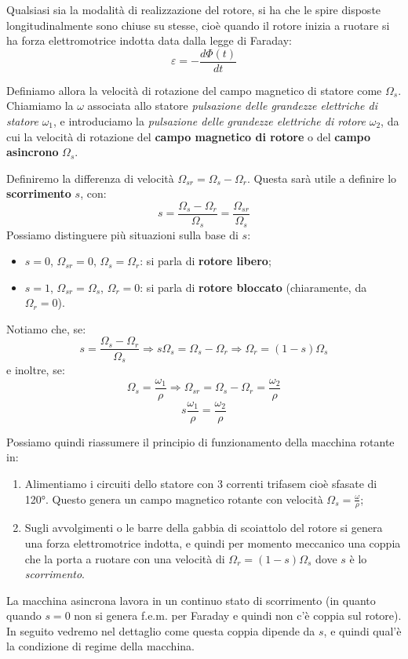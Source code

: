 \documentclass[a4paper,11pt]{article}
\begin{document}
\begin{itemize}
Qualsiasi sia la modalità di realizzazione del rotore, si ha che le spire disposte longitudinalmente sono chiuse su stesse, cioè quando il rotore inizia a ruotare si ha forza elettromotrice indotta data dalla legge di Faraday:
$$
\varepsilon = -\frac{d \Phi(t)}{dt}
$$

Definiamo allora la velocità di rotazione del campo magnetico di statore come $\Omega_s$. Chiamiamo la $\omega$ associata allo statore \textit{pulsazione delle grandezze elettriche di statore} $\omega_1$, e introduciamo la \textit{pulsazione delle grandezze elettriche di rotore} $\omega_2$, da cui la velocità di rotazione del \textbf{campo magnetico di rotore} o del \textbf{campo asincrono} $\Omega_s$.

Definiremo la differenza di velocità $\Omega_{sr} = \Omega_s - \Omega_r$. 
Questa sarà utile a definire lo \textbf{scorrimento} $s$, con:
$$
s = \frac{\Omega_s - \Omega_r}{\Omega_s} = \frac{\Omega_{sr}}{\Omega_s}
$$
Possiamo distinguere più situazioni sulla base di $s$:
\begin{itemize}
	\item $s = 0$, $\Omega_{sr} = 0$, $\Omega_s = \Omega_r$: si parla di \textbf{rotore libero};
	\item $s = 1$, $\Omega_{sr} = \Omega_s$, $\Omega_r = 0$: si parla di \textbf{rotore bloccato} (chiaramente, da $\Omega_r = 0$).
\end{itemize}

Notiamo che, se:
$$
s = \frac{\Omega_s - \Omega_r}{\Omega_s} \Rightarrow s \Omega_s = \Omega_s - \Omega_r \Rightarrow \Omega_r = (1-s)\Omega_s
$$
e inoltre, se:
$$
\Omega_s = \frac{\omega_1}{\rho} \Rightarrow \Omega_{sr} = \Omega_s - \Omega_r = \frac{\omega_2}{\rho}
$$
$$
s \frac{\omega_1}{\rho} = \frac{\omega_2}{\rho}
$$

\end{itemize}

Possiamo quindi riassumere il principio di funzionamento della macchina rotante in:
\begin{enumerate}
	\item Alimentiamo i circuiti dello statore con 3 correnti trifasem cioè sfasate di 120°. Questo genera un campo magnetico rotante con velocità $\Omega_s = \frac{\omega}{\rho}$;
	\item Sugli avvolgimenti o le barre della gabbia di scoiattolo del rotore si genera una forza elettromotrice indotta, e quindi per momento meccanico una coppia che la porta a ruotare con una velocità di $\Omega_r = (1-s) \Omega_s$ dove $s$ è lo \textit{scorrimento}.
\end{enumerate}

La macchina asincrona lavora in un continuo stato di scorrimento (in quanto quando $s=0$ non si genera f.e.m. per Faraday e quindi non c'è coppia sul rotore).
In seguito vedremo nel dettaglio come questa coppia dipende da $s$, e quindi qual'è la condizione di regime della macchina.
\end{document}
